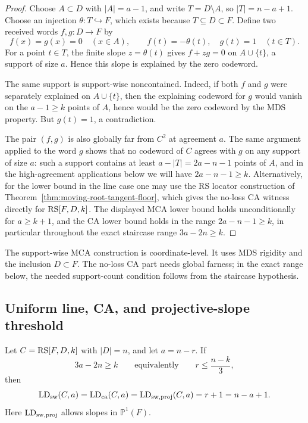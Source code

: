 \begin{proof}
Choose \(A\subset D\) with \(|A|=a-1\), and write
\(T=D\setminus A\), so \(|T|=n-a+1\).  Choose an injection
\(\theta:T\hookrightarrow F\), which exists because \(T\subseteq D\subset F\).
Define two received words \(f,g:D\to F\) by
\[
  f(x)=g(x)=0\quad (x\in A),
  \qquad
  f(t)=-\theta(t),\quad g(t)=1\quad (t\in T).
\]
For a point \(t\in T\), the finite slope \(z=\theta(t)\) gives
\(f+zg=0\) on \(A\cup\{t\}\), a support of size \(a\).  Hence this slope is
explained by the zero codeword.

The same support is support-wise noncontained.  Indeed, if both \(f\) and \(g\)
were separately explained on \(A\cup\{t\}\), then the explaining codeword for
\(g\) would vanish on the \(a-1\ge k\) points of \(A\), hence would be the zero
codeword by the MDS property.  But \(g(t)=1\), a contradiction.

The pair \((f,g)\) is also globally far from \(C^2\) at agreement \(a\).  The
same argument applied to the word \(g\) shows that no codeword of \(C\) agrees
with \(g\) on any support of size \(a\): such a support contains at least
\(a-|T|=2a-n-1\) points of \(A\), and in the high-agreement applications below we
will have \(2a-n-1\ge k\).  Alternatively, for the lower bound in the line case
one may use the RS locator construction of Theorem~\ref{thm:moving-root-tangent-floor},
which gives the no-loss CA witness directly for \(\operatorname{RS}[F,D,k]\).  The displayed
MCA lower bound holds unconditionally for \(a\ge k+1\), and the CA lower bound
holds in the range \(2a-n-1\ge k\), in particular throughout the exact staircase
range \(3a-2n\ge k\).
\end{proof}

\begin{remark}[scope]
The support-wise MCA construction is coordinate-level.  It uses MDS rigidity
and the inclusion \(D\subset F\).  The no-loss CA part needs global farness; in
the exact range below, the needed support-count condition follows from the
staircase hypothesis.
\end{remark}

\subsection{Uniform line, CA, and projective-slope threshold}

\begin{theorem}
\label{thm:uniform-line-staircase}
Let \(C=\operatorname{RS}[F,D,k]\) with \(|D|=n\), and let \(a=n-r\).  If
\[
  3a-2n\ge k
  \qquad\text{equivalently}\qquad
  r\le \frac{n-k}{3},
\]
then
\[
  \operatorname{LD}_{\rm sw}(C,a)
  =
  \operatorname{LD}_{\rm ca}(C,a)
  =
  \operatorname{LD}_{\rm sw,proj}(C,a)
  =
  r+1
  =n-a+1 .
\]
Here \(\operatorname{LD}_{\rm sw,proj}\) allows slopes in \(\mathbb P^1(F)\).
\end{theorem}

